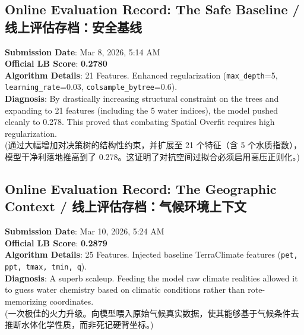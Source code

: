 \subsection{Online Evaluation Record: The Safe Baseline / 线上评估存档：安全基线}
\begin{infobox}
\textbf{Submission Date}: Mar 8, 2026, 5:14 AM \\
\textbf{Official LB Score}: \textbf{0.2780} \\
\textbf{Algorithm Details}: 21 Features. Enhanced regularization (\texttt{max\_depth}=5, \texttt{learning\_rate}=0.03, \texttt{colsample\_bytree}=0.6). \\
\textbf{Diagnosis}: By drastically increasing structural constraint on the trees and expanding to 21 features (including the 5 water indices), the model pushed cleanly to 0.278. This proved that combating Spatial Overfit requires high regularization. \\
(通过大幅增加对决策树的结构性约束，并扩展至 21 个特征（含 5 个水质指数），模型干净利落地推高到了 0.278。这证明了对抗空间过拟合必须启用高压正则化。)
\end{infobox}

\subsection{Online Evaluation Record: The Geographic Context / 线上评估存档：气候环境上下文}
\begin{infobox}
\textbf{Submission Date}: Mar 10, 2026, 5:24 AM \\
\textbf{Official LB Score}: \textbf{0.2879} \\
\textbf{Algorithm Details}: 25 Features. Injected baseline TerraClimate features (\texttt{pet, ppt, tmax, tmin, q}). \\
\textbf{Diagnosis}: A superb scaleup. Feeding the model raw climate realities allowed it to guess water chemistry based on climatic conditions rather than rote-memorizing coordinates. \\
(一次极佳的火力升级。向模型喂入原始气候真实数据，使其能够基于气候条件去推断水体化学性质，而非死记硬背坐标。)
\end{infobox}

